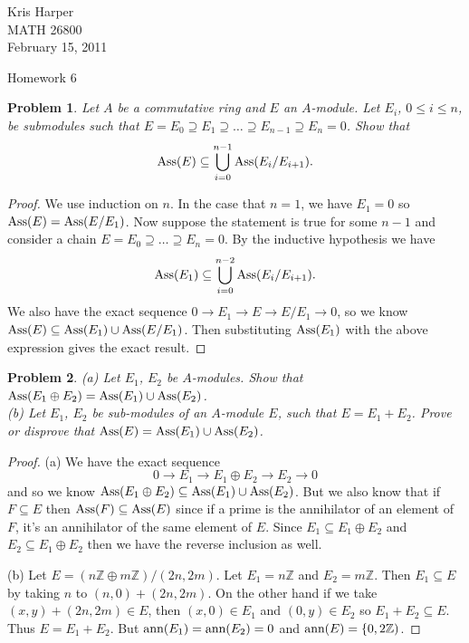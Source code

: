 \documentclass{article}
\newcommand{\ass}{\textup{Ass}}
\newcommand{\ann}{\textup{ann}}
\newtheorem{problem}{Problem}
\begin{document}
\begin{flushright}
Kris Harper\\

MATH 26800\\

February 15, 2011
\end{flushright}

\begin{center}
Homework 6
\end{center}

\begin{problem}
\label{series}
Let $A$ be a commutative ring and $E$ an $A$-module. Let $E_i$, $0 \leq i \leq n$, be submodules such that $E = E_0 \supseteq E_1 \supseteq \dots \supseteq E_{n-1} \supseteq E_n = 0$. Show that
\[
\ass(E) \subseteq \bigcup_{i=0}^{n-1} \ass(E_i/E_{i+1}).
\]
\end{problem}
\begin{proof}
We use induction on $n$. In the case that $n = 1$, we have $E_1 = 0$ so $\ass(E) = \ass(E/E_1)$. Now suppose the statement is true for some $n-1$ and consider a chain $E = E_0 \supseteq \dots \supseteq E_n = 0$. By the inductive hypothesis we have
\[
\ass(E_1) \subseteq \bigcup_{i=0}^{n-2} \ass(E_i/E_{i+1}).
\]
We also have the exact sequence $0 \to E_1 \to E \to E/E_1 \to 0$, so we know $\ass(E) \subseteq \ass(E_1) \cup \ass(E/E_1)$. Then substituting $\ass(E_1)$ with the above expression gives the exact result.
\end{proof}

\begin{problem}
(a) Let $E_1$, $E_2$ be $A$-modules. Show that $\ass(E_1 \oplus E_2) = \ass(E_1) \cup \ass(E_2)$.\\
(b) Let $E_1$, $E_2$ be sub-modules of an $A$-module $E$, such that $E = E_1 + E_2$. Prove or disprove that $\ass(E) = \ass(E_1) \cup \ass(E_2)$.
\end{problem}
\begin{proof}
(a) We have the exact sequence
\[
0 \to E_1 \to E_1 \oplus E_2 \to E_2 \to 0
\]
and so we know $\ass(E_1 \oplus E_2) \subseteq \ass(E_1) \cup \ass(E_2)$. But we also know that if $F \subseteq E$ then $\ass(F) \subseteq \ass(E)$ since if a prime is the annihilator of an element of $F$, it's an annihilator of the same element of $E$. Since $E_1 \subseteq E_1 \oplus E_2$ and $E_2 \subseteq E_1 \oplus E_2$ then we have the reverse inclusion as well.

(b) Let $E = (n\mathbb{Z} \oplus m\mathbb{Z})/(2n, 2m)$. Let $E_1 = n\mathbb{Z}$ and $E_2 = m\mathbb{Z}$. Then $E_1 \subseteq E$ by taking $n$ to $(n,0) + (2n,2m)$. On the other hand if we take $(x,y) + (2n,2m) \in E$, then $(x,0) \in E_1$ and $(0,y) \in E_2$ so $E_1 + E_2 \subseteq E$. Thus $E = E_1 + E_2$. But $\ann(E_1) = \ann(E_2) = 0$ and $\ann(E) = \{0, 2\mathbb{Z})$.
\end{proof}
\end{document}
